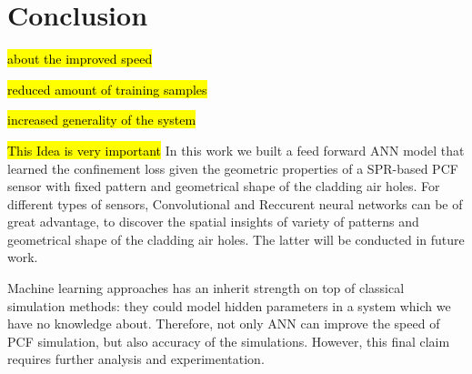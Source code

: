 \documentclass[draft, a4, 10pt, onecolumn]{IEEEtran}
\begin{document}
\begin{table}[h]
\centering
{}
\caption{ANN vs Simulation test runtime performance}
\end{table}
\newpage

\section{Conclusion}
\label{sec:conc}

\hl{about the improved speed}

\hl{reduced amount of training samples}

\hl{increased generality of the system}

\hl{This Idea is very important}
In this work we built a feed forward ANN model that learned the confinement loss given the geometric properties of a SPR-based PCF sensor with fixed pattern and geometrical shape of the cladding air holes. For different types of sensors, Convolutional and Reccurent neural networks can be of great advantage, to discover the spatial insights of variety of patterns and  geometrical shape of the cladding air holes. The latter will be conducted in future work.

Machine learning approaches has an inherit strength on top of classical simulation methods: they could model hidden parameters in a system which we have no knowledge about. Therefore, not only ANN can improve the speed of PCF simulation, but also accuracy of the simulations. However, this final claim requires further analysis and experimentation.
	
\end{document}
